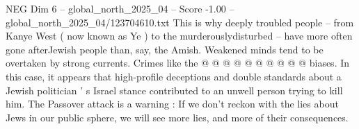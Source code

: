 \begin{textsample}{NEG Dim 6 – global\_north\_2025\_04 – Score -1.00 – global\_north\_2025\_04/123704610.txt}
This is why deeply troubled people -- from Kanye West ( now known as Ye ) to the murderouslydisturbed -- have more often gone afterJewish people than, say, the Amish.
Weakened minds tend to be overtaken by strong currents.
Crimes like the @ @ @ @ @ @ @ @ @ @ biases.
In this case, it appears that high-profile deceptions and double standards about a Jewish politician ' s Israel stance contributed to an unwell person trying to kill him.
The Passover attack is a warning : If we don't reckon with the lies about Jews in our public sphere, we will see more lies, and more of their consequences.

\end{textsample}
